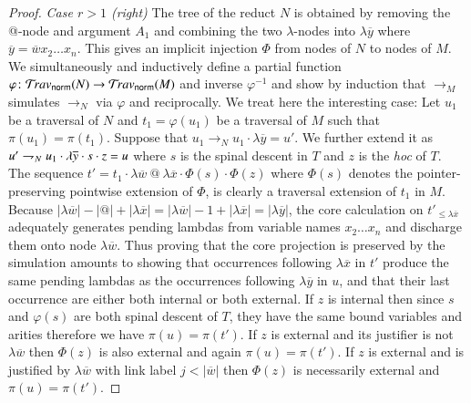 \documentclass{elsarticle}
\theoremstyle{plain}
\theoremstyle{definition}
\newcommand{\normalizing}{{\sf norm}}
\def\coresymbol{\pi} %
\newcommand{\core}[1]{\coresymbol(#1)} %
\begin{document}
\begin{proof}
\noindent
\emph{Case $r>1$ (right)} The tree of the reduct $N$ is obtained by removing the @-node and argument $A_1$ and combining the two $\lambda$-nodes into $\lambda\overline{y}$ where $\overline{y} = \overline{w} x_2 \ldots x_n$.
This gives an implicit injection $\Phi$ from nodes of $N$ to nodes of $M$.
%
We simultaneously and inductively define
a partial function $\varphi\colon\travset_\normalizing(N) \rightarrow\travset_\normalizing(M)$ and inverse $\varphi^{-1}$ and show by induction that $\rightarrow_M$ simulates $\rightarrow_N$ via $\varphi$ and reciprocally.
We treat here the interesting case:
Let $u_1$ be a traversal of $N$ and $t_1=\varphi(u_1)$ be a traversal of $M$ such that $\core{u_1} = \core{t_1}$.
Suppose that $u_1 \rightarrow_N u_1 \cdot \lambda\overline{y} = u'$. We further extend it as $u' \rightharpoondown_N u_1 \cdot \lambda\overline{y} \cdot s \cdot z = u$ where $s$ is the spinal descent in $T$ and $z$ is the \emph{hoc} of $T$.
The sequence $t' = t_1 \cdot \lambda\overline{w} ~ @ ~ \lambda\overline{x} \cdot \Phi(s) \cdot \Phi(z)$
where $\Phi(s)$ denotes the pointer-preserving pointwise extension of $\Phi$, is clearly a traversal extension of $t_1$ in $M$.
%
Because
$|\lambda\overline{w}| - |@| + |\lambda\overline{x}|
=|\lambda\overline{w}| - 1 + |\lambda\overline{x}|
=|\lambda\overline{y}|
$, the core calculation
on $t'_{\leq \lambda\overline{x}}$ adequately generates pending lambdas from variable names $x_2 \ldots x_n$ and discharge them onto node $\lambda\overline{w}$. Thus proving
that the core projection is preserved by the simulation
amounts to showing that occurrences following
$\lambda\overline{x}$ in $t'$ produce the same pending lambdas as the occurrences following $\lambda\overline{y}$ in $u$, and that their last occurrence are either both internal or both external.
%
If $z$ is internal then since $s$ and $\varphi(s)$ are both  spinal descent of $T$, they have the same bound variables and arities therefore we have $\core{u} = \core{t'}$.
If $z$ is external and its justifier is not $\lambda\overline{w}$ then
$\Phi(z)$ is also external and again $\core{u} = \core{t'}$.
If $z$ is external and is justified by $\lambda\overline{w}$ with link label
$j<|\overline{w}|$ then $\Phi(z)$ is necessarily external and $\core{u} = \core{t'}$.

\end{proof}
\end{document}

